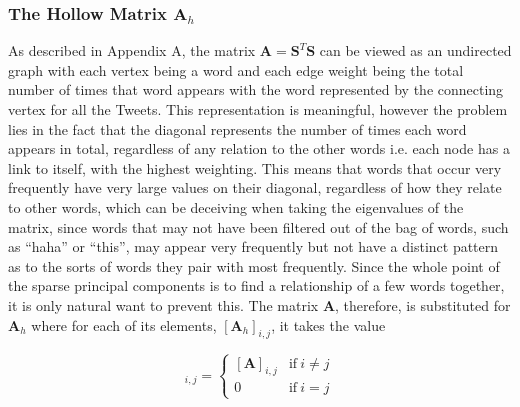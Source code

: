 \documentclass[11pt,a4paper]{article}
\begin{document}
  
\subsubsection{The Hollow Matrix $\mathbf{A}_{h}$}

As described in Appendix A, the matrix $\mathbf{A} = \mathbf{S}^T \mathbf{S}$ can be viewed as an undirected graph with each vertex being a word and each edge weight being the total number of times that word appears with the word represented by the connecting vertex for all the Tweets. This representation is meaningful, however the problem lies in the fact that the diagonal represents the number of times each word appears in total, regardless of any relation to the other words i.e. each node has a link to itself, with the highest weighting. This means that words that occur very frequently have very large values on their diagonal, regardless of how they relate to other words, which can be deceiving when taking the eigenvalues of the matrix, since words that may not have been filtered out of the bag of words, such as ``haha'' or ``this'', may appear very frequently but not have a distinct pattern as to the sorts of words they pair with most frequently. Since the whole point of the sparse principal components is to find a relationship of a few words together, it is only natural want to prevent this. The matrix $\mathbf{A}$, therefore,  is substituted for 
$\mathbf{A}_h$ where for each of its elements, $[\mathbf{A}_h]_{i, j}$, it takes the value 

\begin{equation}
[\mathbf{A}_h]_{i, j}= 
\begin{cases}
[\mathbf{A}]_{i, j} & \text{if}\ i \neq j\\
0 & \text{if}\ i = j
\end{cases}
\end{equation}
\end{document}
